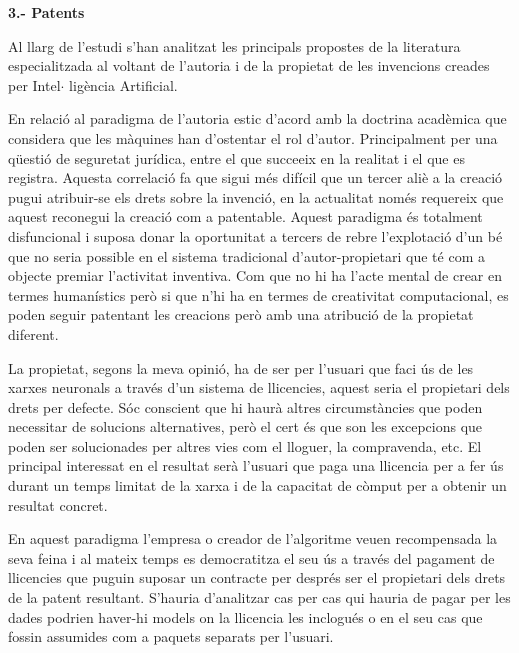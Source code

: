 \documentclass[12pt]{article}
\begin{document}
\vspace{\baselineskip}
\textbf{3.- Patents}\par


\vspace{\baselineskip}
\begin{justify}
Al llarg de l’estudi s’han analitzat les principals propostes de la literatura especialitzada al voltant de l’autoria i de la propietat de les invencions creades per Intel$ \cdot $ ligència Artificial.
\end{justify}\par


\vspace{\baselineskip}
\begin{justify}
En relació al paradigma de l’autoria estic d’acord amb la doctrina acadèmica que considera que les màquines han d’ostentar el rol d’autor. Principalment per una qüestió de seguretat jurídica, entre el que succeeix en la realitat i el que es registra. Aquesta correlació fa que sigui més difícil que un tercer aliè a la creació pugui atribuir-se els drets sobre la invenció, en la actualitat només requereix que aquest reconegui la creació com a patentable. Aquest paradigma és totalment disfuncional i suposa donar la oportunitat a tercers de rebre l’explotació d’un bé que no seria possible en el sistema tradicional d’autor-propietari que té com a objecte premiar l’activitat inventiva. Com que no hi ha l’acte mental de crear en termes humanístics però si que n’hi ha en termes de creativitat computacional, es poden seguir patentant les creacions però amb una atribució de la propietat diferent.
\end{justify}\par

\begin{justify}
La propietat, segons la meva opinió,  ha de ser per l’usuari que faci ús de les xarxes neuronals a través d’un sistema de llicencies, aquest seria el propietari dels drets per defecte. Sóc conscient que hi haurà altres circumstàncies que poden necessitar de solucions alternatives, però el cert és que son les excepcions que poden ser solucionades per altres vies com el lloguer, la compravenda, etc. El principal interessat en el resultat serà l’usuari que paga una llicencia per a fer ús durant un temps limitat de la xarxa i de la capacitat de còmput per a obtenir un resultat concret.
\end{justify}\par


\vspace{\baselineskip}
\begin{justify}
En aquest paradigma l’empresa o creador de l’algoritme veuen recompensada la seva feina i al mateix temps es democratitza el seu ús a través del pagament de llicencies que puguin suposar un contracte per després ser el propietari dels drets de la patent resultant. S’hauria d’analitzar cas per cas qui hauria de pagar per les dades podrien haver-hi models on la llicencia les inclogués o en el seu cas que fossin assumides com a paquets separats per l’usuari. 
\end{justify}\par
\end{document}
